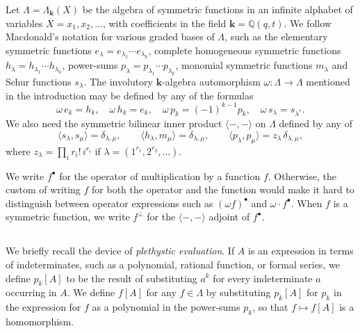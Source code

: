 \documentclass[12pt]{amsart}
\theoremstyle{definition}
\theoremstyle{remark}
\newcommand{\QQ}{{\mathbb Q}}
\newcommand{\kk}{{\mathbf k}}
\begin{document}
Let $\Lambda = \Lambda _{\kk }(X)$ be the algebra of symmetric
functions in an infinite alphabet of variables $X =
x_{1},x_{2},\ldots$, with coefficients in the field $\kk = \QQ (q,t)$.
We follow Macdonald's notation \cite{Macdonald95} for various graded
bases of $\Lambda $, such as the elementary symmetric functions
$e_{\lambda } = e_{\lambda _{1}}\cdots e_{\lambda _{k}}$, complete
homogeneous symmetric functions $h_{\lambda } = h_{\lambda _{1}}\cdots
h_{\lambda _{k}}$, power-sums $p_{\lambda } = p_{\lambda _{1}}\cdots
p_{\lambda _{k}}$, monomial symmetric functions $m_{\lambda }$ and
Schur functions $s_{\lambda }$.  The involutory $\kk $-algebra
automorphism $\omega \colon \Lambda \rightarrow \Lambda $ mentioned in
the introduction may be defined by any of the formulas
\begin{equation}\label{e:omega}
\omega \, e_{k} = h_{k},\quad \omega \, h_{k} = e_{k},\quad \omega \,
p_{k} = (-1)^{k-1} p_{k},\quad \omega \, s_{\lambda } = s_{\lambda
^{*}}.
\end{equation}
We also need the symmetric bilinear inner product $\langle -, -
\rangle$ on $\Lambda $ defined by any of
\begin{equation}\label{e:inner-product}
\langle s_{\lambda },s_{\mu } \rangle = \delta _{\lambda ,\mu },\qquad
\langle h_{\lambda },m_{\mu } \rangle = \delta _{\lambda ,\mu },\qquad
\langle p_{\lambda },p_{\mu } \rangle = z_{\lambda }\, \delta
_{\lambda ,\mu },
\end{equation}
where $z_{\lambda } = \prod _{i} r_{i}!\, i^{r_{i}}$ if $\lambda =
(1^{r_{1}},2^{r_{2}},\ldots)$.

We write $f^{\bullet }$ for the operator of multiplication by a
function $f$.  Otherwise, the custom of writing $f$ for both the
operator and the function would make it hard to distinguish between
operator expressions such as $(\omega f)^{\bullet }$ and $\omega \cdot
f^{\bullet }$.  When $f$ is a symmetric function, we write $f^{\perp
}$ for the $\langle -, - \rangle$ adjoint of $f^{\bullet }$.


\subsection{}
\label{ss:plethysm}

We briefly recall the device of {\em plethystic evaluation}.  If $A$
is an expression in terms of indeterminates, such as a polynomial,
rational function, or formal series, we define $p_{k}[A]$ to be the
result of substituting $a^{k}$ for every indeterminate $a$ occurring
in $A$.  We define $f[A]$ for any $f\in \Lambda $ by substituting
$p_{k}[A]$ for $p_{k}$ in the expression for $f$ as a polynomial in
the power-sums $p_{k}$, so that $f\mapsto f[A]$ is a homomorphism.
\end{document}

